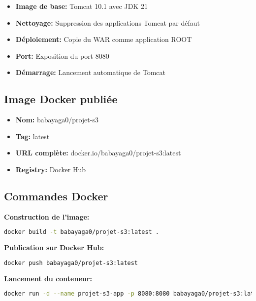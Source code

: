\documentclass[12pt,a4paper]{article}
\begin{document}
\begin{itemize}
    \item \textbf{Image de base:} Tomcat 10.1 avec JDK 21
    \item \textbf{Nettoyage:} Suppression des applications Tomcat par défaut
    \item \textbf{Déploiement:} Copie du WAR comme application ROOT
    \item \textbf{Port:} Exposition du port 8080
    \item \textbf{Démarrage:} Lancement automatique de Tomcat
\end{itemize}

\subsection{Image Docker publiée}

\begin{tcolorbox}[colback=blue!5!white,colframe=blue!75!black,title=Image Docker Hub]
    \begin{itemize}
        \item \textbf{Nom:} babayaga0/projet-s3
        \item \textbf{Tag:} latest
        \item \textbf{URL complète:} docker.io/babayaga0/projet-s3:latest
        \item \textbf{Registry:} Docker Hub
    \end{itemize}
\end{tcolorbox}

\subsection{Commandes Docker}

\textbf{Construction de l'image:}
\begin{lstlisting}[language=bash]
docker build -t babayaga0/projet-s3:latest .
\end{lstlisting}

\textbf{Publication sur Docker Hub:}
\begin{lstlisting}[language=bash]
docker push babayaga0/projet-s3:latest
\end{lstlisting}

\textbf{Lancement du conteneur:}
\begin{lstlisting}[language=bash]
docker run -d --name projet-s3-app -p 8080:8080 babayaga0/projet-s3:latest
\end{lstlisting}
\end{document}
